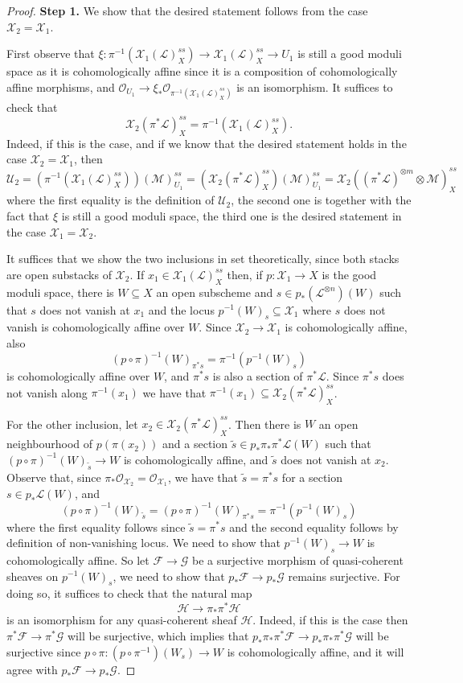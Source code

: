 \documentclass{amsart}
\newcommand{\cF}{\mathcal{F}}
\newcommand{\cG}{\mathcal{G}}
\newcommand{\cH}{\mathcal{H}}
\newcommand{\cL}{\mathcal{L}}
\newcommand{\cM}{\mathcal{M}}
\newcommand{\cO}{\mathcal{O}}
\newcommand{\cU}{\mathcal{U}}
\newcommand{\cX}{\mathcal{X}}
\theoremstyle{definition}
\theoremstyle{definition}
\begin{document}
{\begin{proof}
\textbf{Step 1.} We show that the desired statement follows from the case $\cX_2=\cX_1$.

First observe that $\xi:\pi^{-1}(\cX_1(\cL)^{ss}_X)\to \cX_1(\cL)^{ss}_X\to U_1$ is still a good moduli space as it is cohomologically affine since it is a composition of cohomologically affine morphisms, and $\cO_{U_1}\to \xi_*\cO_{\pi^{-1}
(\cX_1(\cL)^{ss}_X)}$ is an isomorphism.  It suffices to check that \begin{equation}\label{eq_2}\cX_2(\pi^*\cL)^{ss}_X = \pi^{-1}(\cX_1(\cL)^{ss}_X).\end{equation} Indeed, if this is the case, and if we know that the desired statement holds in the case $\cX_2=\cX_1$, then \[
\cU_2 = (\pi^{-1}(\cX_1(\cL)^{ss}_X))(\cM)^{ss}_{U_1} = (\cX_2(\pi^*\cL)^{ss}_X)(\cM)^{ss}_{U_1} =\cX_2((\pi^*\cL)^{\otimes m}\otimes\cM)^{ss}_X
\]
where the first equality is the definition of $\cU_2$, the second one is  together with the fact that $\xi$ is still a good moduli space, the third one is the desired statement in the case $\cX_1=\cX_2$.

It suffices that we show the two inclusions in  set theoretically, since both stacks are open substacks of $\cX_2$. If $x_1\in \cX_1(\cL)^{ss}_X$ then, if $p:\cX_1\to X$ is the good moduli space, there is $W\subseteq X$ an open subscheme and $s\in p_*(\cL^{\otimes n})(W)$ such that $s$ does not vanish at $x_1$ and the locus $p^{-1}(W)_s\subseteq \cX_1$ where $s$ does not vanish is cohomologically affine over $W$. Since $\cX_2\to\cX_1$ is cohomologically affine, also \[(p\circ\pi)^{-1}(W)_{\pi^*s} = \pi^{-1}(p^{-1}(W)_s)\] is cohomologically affine over $W$, and $\pi^*s$ is also a section of $\pi^*\cL$. Since $\pi^*s$ does not vanish along $\pi^{-1}(x_1)$ we have that $\pi^{-1}(x_1)\subseteq \cX_2(\pi^*\cL)^{ss}_X$.

For the other inclusion, let $x_2\in \cX_2(\pi^*\cL)^{ss}_X$. Then there is $W$ an open neighbourhood of $p(\pi(x_2))$ and a section $\widetilde{s}\in p_*\pi_*\pi^*\cL(W)$ such that $(p\circ\pi)^{-1}(W)_{\widetilde{s}}\to W$ is cohomologically affine, and $\widetilde{s}$ does not vanish at $x_2$. Observe that, since $\pi_*\cO_{\cX_2}=\cO_{\cX_1}$, we have that
$\widetilde{s}=\pi^*s$ for a section $s\in p_*\cL(W)$, and \[(p\circ\pi)^{-1}(W)_{\widetilde{s}}=(p\circ\pi)^{-1}(W)_{\pi^*s} = \pi^{-1}(p^{-1}(W)_s)\]
where the first equality follows since $\widetilde{s}=\pi^*s$ and the second equality follows by definition of non-vanishing locus.
We need to show that $p^{-1}(W)_s\to W$ is cohomologically affine. So let $\cF\to \cG$ be a surjective morphism of quasi-coherent sheaves on $p^{-1}(W)_s$, we need to show that $p_*\cF\to p_*\cG$ remains surjective. For doing so, it suffices to check that the natural map \[\cH\to\pi_*\pi^*\cH\] is an isomorphism for any quasi-coherent sheaf $\cH$. Indeed, if this is the case then $\pi^*\cF\to \pi^*\cG$ will be surjective, which implies that $p_*\pi_*\pi^*\cF\to p_*\pi_*\pi^*\cG$ will be surjective since $p\circ\pi:(p\circ\pi^{-1})(W_s)\to W$ is cohomologically affine, and it will agree with $p_*\cF\to p_*\cG$. 


\end{proof}}
\end{document}
